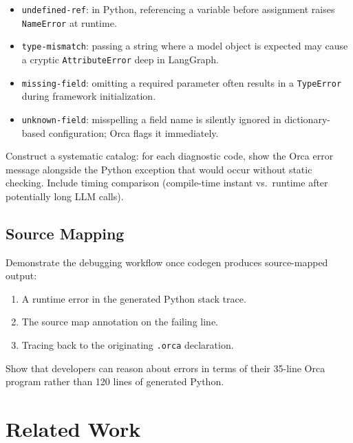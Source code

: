 \documentclass[sigconf,nonacm]{acmart}
\begin{document}
\begin{itemize}[leftmargin=*]
  \item \texttt{undefined-ref}: in Python, referencing a variable before
        assignment raises \texttt{NameError} at runtime.
  \item \texttt{type-mismatch}: passing a string where a model object is
        expected may cause a cryptic \texttt{AttributeError} deep in
        LangGraph.
  \item \texttt{missing-field}: omitting a required parameter often results
        in a \texttt{TypeError} during framework initialization.
  \item \texttt{unknown-field}: misspelling a field name is silently ignored
        in dictionary-based configuration; Orca flags it immediately.
\end{itemize}

\begin{todobox}
Construct a systematic catalog: for each diagnostic code, show the Orca
error message alongside the Python exception that would occur without
static checking. Include timing comparison (compile-time instant vs.\
runtime after potentially long LLM calls).
\end{todobox}

\subsection{Source Mapping}
\label{sec:eval:sourcemap}

\begin{todobox}
Demonstrate the debugging workflow once codegen produces source-mapped
output:
\begin{enumerate}
  \item A runtime error in the generated Python stack trace.
  \item The source map annotation on the failing line.
  \item Tracing back to the originating \texttt{.orca} declaration.
\end{enumerate}
Show that developers can reason about errors in terms of their 35-line
Orca program rather than 120 lines of generated Python.
\end{todobox}

\section{Related Work}
\label{sec:related}
\end{document}
